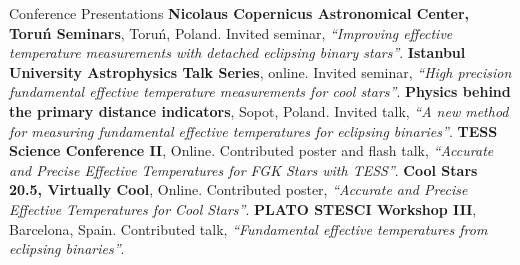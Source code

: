 \begin{rubric}{Conference Presentations}
\entry*[2023]%
        \textbf{Nicolaus Copernicus Astronomical Center, Toru\'{n} Seminars}, Toru\'{n}, Poland. Invited seminar, \textit{``Improving effective temperature measurements with detached eclipsing binary stars''}.
\entry*[2022]%
        \textbf{Istanbul University Astrophysics Talk Series}, online. Invited seminar, \textit{``High precision fundamental effective temperature measurements for cool stars''}.
\entry*[2021]%
	\textbf{Physics behind the primary distance indicators}, Sopot, Poland. Invited talk, \textit{``A new method for measuring fundamental effective temperatures for eclipsing binaries''}.
\entry*[2021]%
	\textbf{TESS Science Conference II}, Online. Contributed poster and flash talk, \textit{``Accurate and Precise Effective Temperatures for FGK Stars with TESS''}. 
\entry*[2021]%
	\textbf{Cool Stars 20.5, Virtually Cool}, Online. Contributed poster, \textit{``Accurate and Precise Effective Temperatures for Cool Stars''}. 
\entry*[2019]%
	\textbf{PLATO STESCI Workshop III}, Barcelona, Spain. Contributed talk, \textit{``Fundamental effective temperatures from eclipsing binaries''}.  
%
%
%
%
\end{rubric}